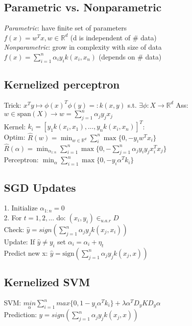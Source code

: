 \subsection*{Parametric vs. Nonparametric}
\emph{Parametric}: have finite set of parameters\\
$f(x) = w^Tx, w\in \mathbb{R}^d$ (d is independent of \# data)\\
\emph{Nonparametric}: grow in complexity with size of data\\
$f(x) = \sum_{i=1}^n \alpha_i y_i k(x_i,x_n)$ (depends on \# data)

\subsection*{Kernelized perceptron}
Trick: $x^Ty \mapsto \phi(x)^T \phi(y) =: k(x,y)$ s.t. $ \exists \phi: X \rightarrow \mathds{R}^d $
Ass: $w \in \text{span}(X) \rightarrow  w=\sum_{j=1}^n \alpha_j y_j x_j$\\
Kernel: $k_i=[y_1 k(x_i,x_1), ..., y_n k(x_i,x_n)]^T$:\\
Optim: $\hat{R}(w)=\min_{w\in \mathds{R}^d} \sum_{i}^n \max \{0, -y_i w^T x_i\}$\\
$\hat{R}(\alpha)= \min_{\alpha_{1:n}} \sum_{i=1}^n \max \{0,- \sum_{j=1}^n \alpha_j y_i y_j x_i^T x_j \}$\\
Perceptron: $\min_\alpha \sum_{i=1}^n \max\{0,-y_i \alpha^T k_i\}$
\subsection*{SGD Updates}
1. Initialize $\alpha_{1:n} = 0$\\
2. For $t = 1, 2, ...$ do:  $(x_i,y_i) \in_{u.a.r} D$\\
Check: $\hat{y} = sign(\sum_{j=1}^n \alpha_j y_j k(x_j,x_i))$\\
Update: If $\hat{y} \not = y_i$ set $\alpha_i = \alpha_i + \eta_t$\\
Predict new x: $\hat{y} = \text{sign}(\sum_{j=1}^n \alpha_j y_j k(x_j,x))$
\subsection*{Kernelized SVM}
SVM: $\underset{\alpha}{min}\sum_{i=1}^n max\{0,1-y_i \alpha^T k_i\} +\lambda\alpha^T D_y K D_y \alpha$\\
Prediction: $y = sign(\sum_{j=1}^n \alpha_j y_j k(x_j,x))$

